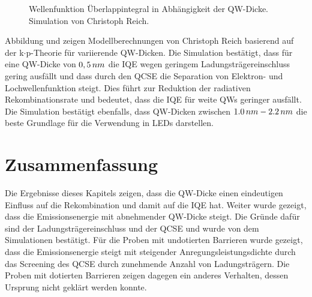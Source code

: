 \begin{figure}[H]
\begin{minipage}[t]{0.49\textwidth}
		\caption{Wellenfunktion Überlappintegral in Abhängigkeit der QW-Dicke. Simulation von Christoph Reich.}
    \label{fig:dotiertSpektrum}
  \end{minipage}
\end{figure}
\noindent 
% 
Abbildung und zeigen Modellberechnungen von Christoph Reich basierend auf der k$\cdot$p-Theorie für variierende QW-Dicken. Die Simulation bestätigt, dass für eine QW-Dicke von $0,5 \thinspace nm$ die IQE wegen geringem Ladungsträgereinschluss gering ausfällt und dass durch den QCSE die Separation von Elektron- und Lochwellenfunktion steigt. Dies führt zur Reduktion der radiativen Rekombinationsrate und bedeutet, dass die IQE für weite QWs geringer ausfällt. Die Simulation bestätigt ebenfalls, dass QW-Dicken zwischen $1.0 \thinspace nm- 2.2 \thinspace nm$ die beste Grundlage für die Verwendung in LEDs darstellen.

\section{Zusammenfassung}

Die Ergebnisse dieses Kapitels zeigen, dass die QW-Dicke einen eindeutigen Einfluss auf die Rekombination und damit auf die IQE hat. Weiter wurde gezeigt, dass die Emissionsenergie mit abnehmender QW-Dicke steigt. Die Gründe dafür sind der Ladungsträgereinschluss und der QCSE und wurde von dem Simulationen bestätigt. Für die Proben mit undotierten Barrieren wurde gezeigt, dass die Emissionsenergie steigt mit steigender Anregungsleistungsdichte durch das Screening des QCSE durch zunehmende Anzahl von Ladungsträgern. Die Proben mit dotierten Barrieren zeigen dagegen ein anderes Verhalten, dessen Ursprung nicht geklärt werden konnte.   